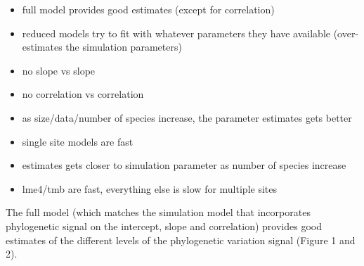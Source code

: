 

\begin{itemize}
\item{full model provides good estimates (except for correlation)}
\item{reduced models try to fit with whatever parameters they have available (over-estimates the simulation parameters)}
\item{no slope vs slope}
\item{no correlation vs correlation}
\item{as size/data/number of species increase, the parameter estimates gets better}
\item{single site models are fast}
\item{estimates gets closer to simulation parameter as number of species increase}
\item{lme4/tmb are fast, everything else is slow for multiple sites}
\end{itemize}

The full model (which matches the simulation model that incorporates phylogenetic signal on the intercept, slope and correlation) provides good estimates of the different levels of the phylogenetic variation signal (Figure 1 and 2). 


